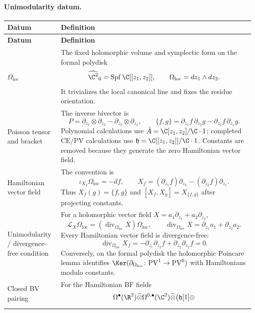 \paragraph{Unimodularity datum.}
\begin{longtable}{@{}>{\raggedright\arraybackslash}p{}
  >{\raggedright\arraybackslash}p{}@{}}
\hline
\textbf{Datum} & \textbf{Definition}\\
\hline
\endfirsthead
\hline
\textbf{Datum} & \textbf{Definition}\\
\hline
\endhead
\(\Omega_{\mathrm{loc}}\) &
The fixed holomorphic volume and symplectic form on the formal polydisk
\[
  \widehat{\C^2}_0=\operatorname{Spf}\C[[z_1,z_2]],
  \qquad
  \Omega_{\mathrm{loc}}=dz_1\wedge dz_2 .
\]
It trivializes the local canonical line and fixes the residue
orientation.\\
\hline
Poisson tensor and bracket &
The inverse bivector is
\[
  P=\partial_{z_1}\otimes\partial_{z_2}
    -\partial_{z_2}\otimes\partial_{z_1},
  \qquad
  \{f,g\}=\partial_{z_1}f\,\partial_{z_2}g
    -\partial_{z_2}f\,\partial_{z_1}g .
\]
Polynomial calculations use \(\bar A=\C[z_1,z_2]/\C\cdot1\); completed
CE/PV calculations use
\(\mathfrak h=\C[[z_1,z_2]]/\C\cdot1\).  Constants are removed because
they generate the zero Hamiltonian vector field.\\
\hline
Hamiltonian vector field &
The convention is
\[
  \iota_{X_f}\Omega_{\mathrm{loc}}=-df,\qquad
  X_f=(\partial_{z_1}f)\partial_{z_2}
      -(\partial_{z_2}f)\partial_{z_1}.
\]
Thus \(X_f(g)=\{f,g\}\) and
\([X_f,X_g]=X_{\{f,g\}}\) after projecting constants.\\
\hline
Unimodularity / divergence-free condition &
For a holomorphic vector field
\(X=a_1\partial_{z_1}+a_2\partial_{z_2}\),
\[
  \mathcal L_X\Omega_{\mathrm{loc}}
    =(\operatorname{div}_{\Omega_{\mathrm{loc}}}X)\Omega_{\mathrm{loc}},
  \qquad
  \operatorname{div}_{\Omega_{\mathrm{loc}}}X
    =\partial_{z_1}a_1+\partial_{z_2}a_2 .
\]
Every Hamiltonian vector field is divergence-free:
\[
  \operatorname{div}_{\Omega_{\mathrm{loc}}}X_f
  =-\partial_{z_1}\partial_{z_2}f
    +\partial_{z_2}\partial_{z_1}f=0 .
\]
Conversely, on the formal polydisk the holomorphic Poincare lemma identifies
\(\Ker(\partial_{\Omega_{\mathrm{loc}}}\colon\mathrm{PV}^1\to
\mathrm{PV}^0)\) with Hamiltonians modulo constants.\\
\hline
Closed BV pairing &
For the Hamiltonian BF fields
\[
  \Omega^\bullet(\R^2)\widehat\otimes\Omega^{0,\bullet}(\C^2)
  \widehat\otimes
  \bigl(\mathfrak h[1]\oplus
\]
\end{longtable}

